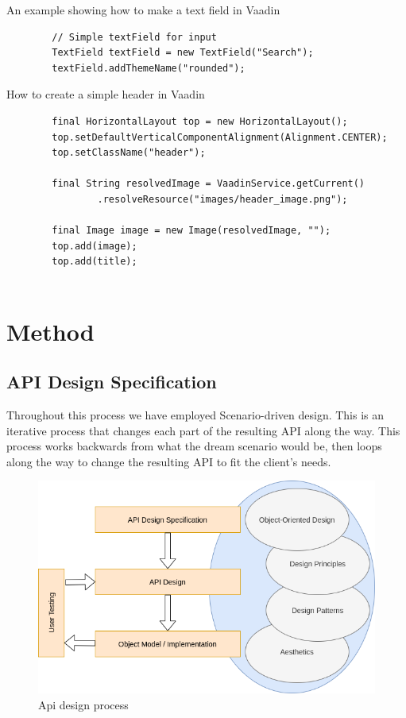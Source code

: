 \documentclass[12pt]{article}
\begin{document}
\begin{shaded}
    An example showing how to make a text field in Vaadin
    \begin{lstlisting}
        // Simple textField for input
        TextField textField = new TextField("Search");
        textField.addThemeName("rounded");
    \end{lstlisting}

    How to create a simple header in Vaadin
    \begin{lstlisting}
        final HorizontalLayout top = new HorizontalLayout();
        top.setDefaultVerticalComponentAlignment(Alignment.CENTER);
        top.setClassName("header");

        final String resolvedImage = VaadinService.getCurrent()
                .resolveResource("images/header_image.png");

        final Image image = new Image(resolvedImage, "");
        top.add(image);
        top.add(title);


    \end{lstlisting}


\end{shaded}

\section{Method}

    \subsection{API Design Specification}

    Throughout this process we have employed Scenario-driven design. This is an iterative process that changes each part of the resulting API along the way. This process works backwards from what the dream scenario would be, then loops along the way to change the resulting API to fit the client’s needs.
    
    \begin{figure}[H]
        \centering
        \includegraphics[scale=0.5]{images/api-design-process.png}
        \caption{Api design process}
    \end{figure}
\end{document}

